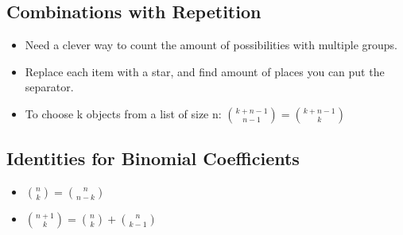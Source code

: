 \subsection{Combinations with Repetition}
\begin{itemize}
    \item Need a clever way to count the amount of possibilities with multiple groups.
    \item Replace each item with a star, and find amount of places you can put the separator.
    \item To choose k objects from a list of size n: ${{k + n - 1} \choose {n - 1}} = {{k + n - 1} \choose {k}}$ 
\end{itemize}

\subsection{Identities for Binomial Coefficients}
\begin{itemize}
    \item ${n \choose k}={n \choose {n-k}}$
    \item ${{n+1} \choose k} = {n \choose k} + {n \choose {k-1}}$
\end{itemize}